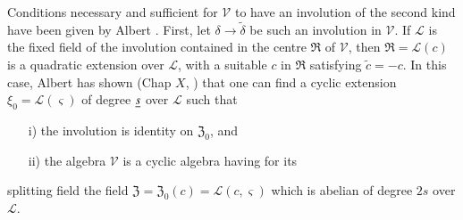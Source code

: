 Conditions necessary and sufficient for $\mathscr{V}$ to have an
involution of the second kind have been given by Albert
\cite{1}. First, let $\delta \rightarrow \widetilde{\delta}$ be such
an involution in $\mathscr{V}$. If $\mathscr{L}$ is the fixed field of
the involution contained in the centre $\mathfrak{R}$ of
$\mathscr{V}$, then $\mathfrak{R} = \mathscr{L}(c)$ is a quadratic
extension over $\mathscr{L}$, with a suitable $c$ in $\mathfrak{R}$
satisfying $\widetilde{c}=-c$. In this case, Albert has shown (Chap
$X$, \cite{1}) that one can find a cyclic extension $\xi_0 =
\mathscr{L}(\varsigma)$ of degree $\underline{s}$ over $\mathscr{L}$ such
that 
\begin{itemize}
\item[{\rm i)}] the involution is identity on $\mathfrak{Z}_0$, and

\item[{\rm ii)}] the algebra $\mathscr{V}$ is a cyclic algebra having
  for its 
\end{itemize}
splitting field the field $\mathfrak{Z}= \mathfrak{Z}_0
  (c)=\mathscr{L}(c,\varsigma)$ which is abelian of degree $2s$ over
  $\mathscr{L}$. 

